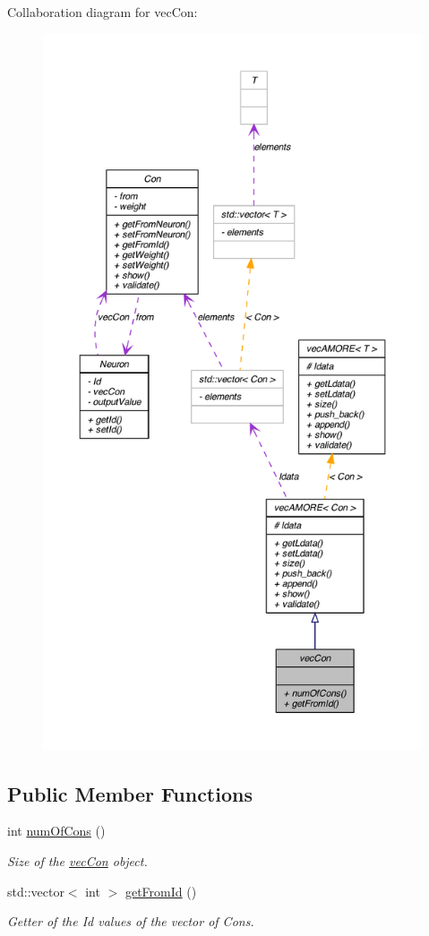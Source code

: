 Collaboration diagram for vecCon:\nopagebreak
\begin{figure}[H]
\begin{center}
\leavevmode
\includegraphics[height=600pt]{classvec_con__coll__graph}
\end{center}
\end{figure}
\subsection*{Public Member Functions}
\begin{DoxyCompactItemize}
\item 
int \hyperlink{classvec_con_a1e39a5e78c40ae8af9bbd2fd7f0dc749}{numOfCons} ()
\begin{DoxyCompactList}\small\item\em Size of the \hyperlink{classvec_con}{vecCon} object. \end{DoxyCompactList}\item 
std::vector$<$ int $>$ \hyperlink{classvec_con_aa9f3f5df4c4060951c975c4c829b8471}{getFromId} ()
\begin{DoxyCompactList}\small\item\em Getter of the Id values of the vector of Cons. \end{DoxyCompactList}\end{DoxyCompactItemize}


